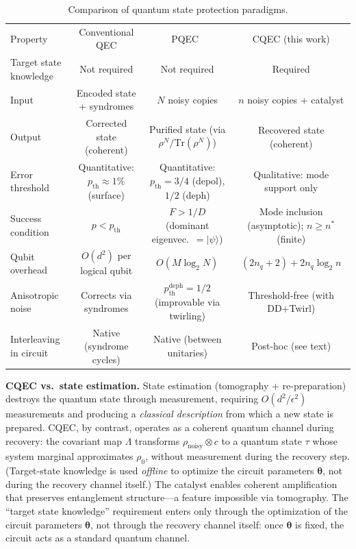 \documentclass[prx,twocolumn,superscriptaddress,longbibliography,floatfix]{revtex4-2}
\begin{document}
\begin{table}[t]
\caption{Comparison of quantum state protection paradigms.}
\label{tab:paradigms}
\begin{ruledtabular}
\begin{tabular}{lccc}
Property & Conventional QEC & PQEC~\cite{Raghoonanan2026} & CQEC (this work) \\
\colrule
Target state knowledge & Not required & Not required & Required \\
Input & Encoded state + syndromes & $N$ noisy copies & $n$ noisy copies + catalyst \\
Output & Corrected state (coherent) & Purified state (via $\rho^N/\mathrm{Tr}(\rho^N)$) & Recovered state (coherent) \\
Error threshold & Quantitative: $p_\mathrm{th} \approx 1\%$ (surface) & Quantitative: $p_\mathrm{th} = 3/4$ (depol), $1/2$ (deph) & Qualitative: mode support only \\
Success condition & $p < p_\mathrm{th}$ & $F > 1/D$ (dominant eigenvec.\ $= |\psi\rangle$) & \makecell{Mode inclusion (asymptotic);\\ $n \geq n^*$ (finite)} \\
Qubit overhead & $O(d^2)$ per logical qubit & $O(M \log_2 N)$ & $(2n_q\!+\!2) + 2n_q \log_2 n$ \\
Anisotropic noise & Corrects via syndromes & $p_\mathrm{th}^{\mathrm{deph}} = 1/2$ (improvable via twirling) & Threshold-free (with DD+Twirl) \\
Interleaving in circuit & Native (syndrome cycles) & Native (between unitaries) & Post-hoc (see text) \\
\end{tabular}
\end{ruledtabular}
\end{table}

\textbf{CQEC vs.\ state estimation.}
State estimation (tomography + re-preparation) destroys the quantum state through measurement, requiring $O(d^2/\epsilon^2)$ measurements and producing a \emph{classical description} from which a new state is prepared.
CQEC, by contrast, operates as a coherent quantum channel during recovery: the covariant map $\Lambda$ transforms $\rho_\mathrm{noisy} \otimes c$ to a quantum state $\tau$ whose system marginal approximates $\rho_0$, without measurement during the recovery step.
(Target-state knowledge is used \emph{offline} to optimize the circuit parameters $\boldsymbol{\theta}$, not during the recovery channel itself.)
The catalyst enables coherent amplification that preserves entanglement structure---a feature impossible via tomography.
The ``target state knowledge'' requirement enters only through the optimization of the circuit parameters $\boldsymbol{\theta}$, not through the recovery channel itself: once $\boldsymbol{\theta}$ is fixed, the circuit acts as a standard quantum channel.
\end{document}
